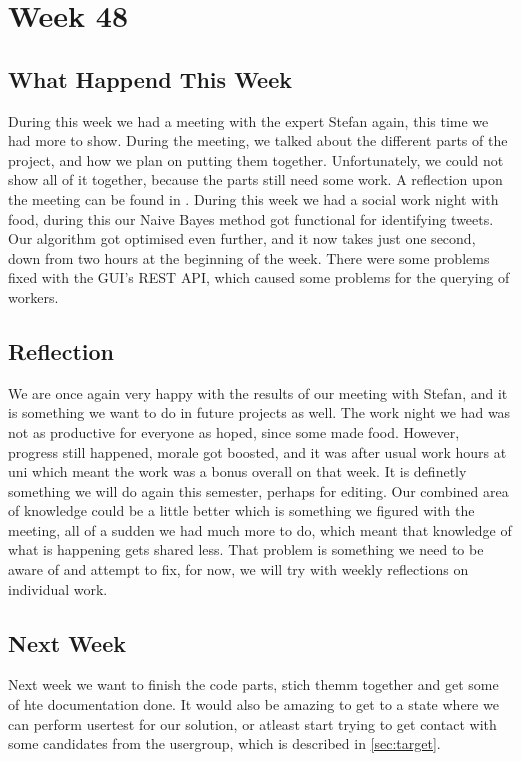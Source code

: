 \section*{Week 48} 
\subsection*{What Happend This Week}
During this week we had a meeting with the expert Stefan again, this time we had
more to show. During the meeting, we talked about the different parts of the
project, and how we plan on putting them together. Unfortunately, we could not
show all of it together, because the parts still need some work. A reflection
upon the meeting can be found in .
During this week we had a social work night with food, during this our Naive
Bayes method got functional for identifying tweets. Our algorithm got optimised
even further, and it now takes just one second, down from two hours at the
beginning of the week. There were some problems fixed with the \ac{GUI}'s
\ac{REST} \ac{API}, which caused some problems for the querying of workers.

\subsection*{Reflection}
We are once again very happy with the results of our meeting with Stefan, and it
is something we want to do in future projects as well. The work night we had was
not as productive for everyone as hoped, since some made food. However, progress
still happened, morale got boosted, and it was after usual work hours at uni
which meant the work was a bonus overall on that week. It is definetly something
we will do again this semester, perhaps for editing. Our combined area of
knowledge could be a little better which is something we figured with the
meeting, all of a sudden we had much more to do, which meant that knowledge of
what is happening gets shared less. That problem is something we need to be
aware of and attempt to fix, for now, we will try with weekly reflections on
individual work.

\subsection*{Next Week}
Next week we want to finish the code parts, stich themm together and get some of
hte documentation done. It would also be amazing to get to a state where we can
perform usertest for our solution, or atleast start trying to get contact with
some candidates from the usergroup, which is described in \autoref{sec:target}.



